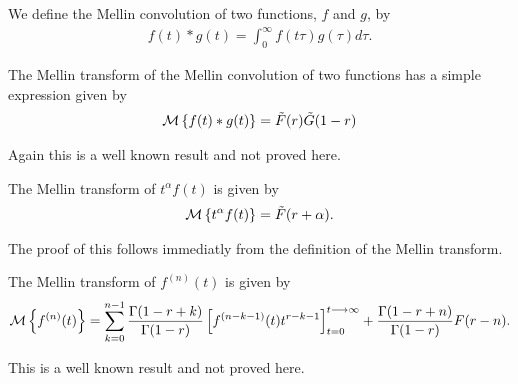 \documentclass{unswmaths}
\begin{document}
\begin{definition}
	We define the Mellin convolution of two functions, $ f $ and $ g $, by
	\begin{align*}
		f(t) * g(t) = \int_0^\infty f(t\tau)g(\tau) d\tau.
	\end{align*}
\end{definition}

\begin{theorem}
\label{thm:mel-conv}
	The Mellin transform of the Mellin convolution of two functions has a simple expression given by
	\begin{align*}
		\mathcal{M} \left\{ f(t) * g(t) \right\} = \tilde{F}(r)\tilde{G}(1-r)
	\end{align*}
\end{theorem}
Again this is a well known result and not proved here.

\begin{lemma}
	\label{lem:mel-power}
	The Mellin transform of $ t^\alpha f(t) $ is given by
	\begin{align*}
		\mathcal{M} \left\{ t^\alpha f(t) \right\} = \tilde{F}(r + \alpha).
	\end{align*}
\end{lemma}
The proof of this follows immediatly from the definition of the Mellin transform.

\begin{lemma}
	The Mellin transform of $ f^{(n)}(t) $ is given by
	\begin{align*}
		\mathcal{M} \left\{ f^{(n)}(t) \right\} = \sum_{k=0}^{n-1} \frac{\Gamma(1-r+k)}{\Gamma(1-r)} \left[ f^{(n-k-1)}(t)t^{r-k-1}\right]_{t=0}^{t\longrightarrow\infty} + \frac{\Gamma(1-r+n)}{\Gamma(1-r)}F(r-n).
	\end{align*}
\end{lemma}
This is a well known result and not proved here.
\end{document}
